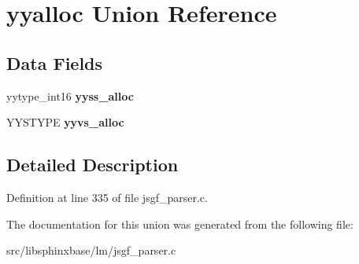 \section{yyalloc \-Union \-Reference}
\label{unionyyalloc}
\subsection*{\-Data \-Fields}
\begin{DoxyCompactItemize}
\item 
yytype\-\_\-int16 {\bfseries yyss\-\_\-alloc}\label{unionyyalloc_a4800e0520a89a4789afa7b5d82197e65}

\item 
\-Y\-Y\-S\-T\-Y\-P\-E {\bfseries yyvs\-\_\-alloc}\label{unionyyalloc_a9326f4fdc6f737a929444427836d8928}

\end{DoxyCompactItemize}


\subsection{\-Detailed \-Description}


\-Definition at line 335 of file jsgf\-\_\-parser.\-c.



\-The documentation for this union was generated from the following file\-:\begin{DoxyCompactItemize}
\item 
src/libsphinxbase/lm/jsgf\-\_\-parser.\-c\end{DoxyCompactItemize}
